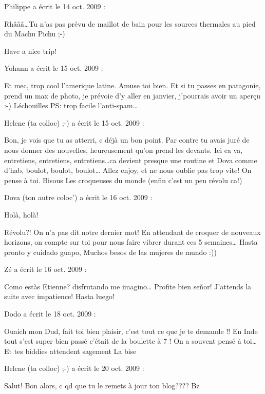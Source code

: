 \medskip
Philippe a écrit le 14 oct. 2009 :
\begin{displayquote}
Rhâââ\dots Tu n'as pas prévu de maillot de bain pour les sources thermales au pied du Machu Pichu ;-)

Have a nice trip!
\end{displayquote}

\medskip
Yohann a écrit le 15 oct. 2009 :
\begin{displayquote}
Et mec, trop cool l'amerique latine. Amuse toi bien. Et si tu passes en patagonie, prend un max de photo, je prévoie d'y aller en janvier, j'pourrais avoir un aperçu :-)
Léchouilles
PS: trop facile l'anti-spam\dots
\end{displayquote}

\medskip
Helene (ta colloc) ;-) a écrit le 15 oct. 2009 :
\begin{displayquote}
Bon, je vois que tu as atterri, c déjà un bon point.
Par contre tu avais juré de nous donner des nouvelles, heureusement qu'on prend les devants.
Ici ca va, entretiens, entretiens, entretiens\dots ca devient presque une routine et Dova comme d'hab, boulot, boulot, boulot\dots
Allez enjoy, et ne nous oublie pas trop vite!
On pense à toi.
Bisous
Les croqueuses du monde (enfin c'est un peu révolu ca!)
\end{displayquote}

\medskip
Dova (ton autre coloc') a écrit le 16 oct. 2009 :
\begin{displayquote}
Holà, holà!

Révolu?! On n'a pas dit notre dernier mot!
En attendant de croquer de nouveaux horizons, on compte sur toi pour nous faire vibrer durant ces 5 semaines\dots
Hasta pronto y cuidado guapo,
Muchos besos de las mujeres de mundo :))
\end{displayquote}

\medskip
Zé a écrit le 16 oct. 2009 :
\begin{displayquote}
Como estàs Etienne? disfrutando me imagino\dots
Profite bien señor! J'attends la suite avec impatience!
Hasta luego!
\end{displayquote}

\medskip
Dodo a écrit le 18 oct. 2009 :
\begin{displayquote}
Ouaich mon Dud, fait toi bien plaisir, c'est tout ce que je te demande !! En Inde tout s'est super bien passé c'était de la boulette à 7 ! On a souvent pensé à toi\dots Et tes biddies attendent sagement
La bise
\end{displayquote}

\medskip
Helene (ta colloc) ;-) a écrit le 20 oct. 2009 :
\begin{displayquote}
Salut!
Bon alors, c qd que tu le remets à jour ton blog????
Bz
\end{displayquote}

\vfill
